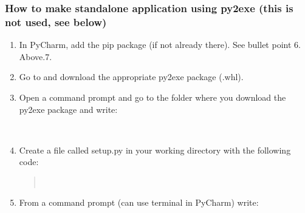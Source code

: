 \documentclass[letterpaper,10pt,english]{sphinxmanual}
\begin{document}
\subsubsection{How to make standalone application using py2exe (this is not used, see below)}
\label{\detokenize{DevelopmentGuidelines:how-to-make-standalone-application-using-py2exe-this-is-not-used-see-below}}\begin{enumerate}
\item {} 
In PyCharm, add the pip package (if not already there). See bullet
point 6. Above.7.

\item {} 
Go to  and download the
appropriate py2exe package (.whl).

\item {} 
Open a command prompt and go to the folder where you download the
py2exe package and write:

%
\begin{sphinxVerbatim}[commandchars=\\\{\}]
 
\end{sphinxVerbatim}

\item {} 
Create a file called setup.py in your working directory with the
following code:
\begin{quote}

%
\begin{sphinxVerbatim}[commandchars=\\\{\}]
   
 
\end{sphinxVerbatim}

%
\begin{sphinxVerbatim}[commandchars=\\\{\}]
\PYG{p}{[}\PYG{p}{]}
\end{sphinxVerbatim}
\end{quote}

\item {} 
From a command prompt (can use terminal in PyCharm) write:

\end{enumerate}
\end{document}
